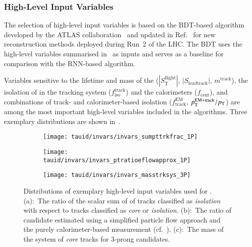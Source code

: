 \subsubsection{High-Level Input Variables}

The selection of high-level input variables is based on the BDT-based
\tauid algorithm developed by the ATLAS
collaboration~\cite{ATL-PHYS-PUB-2015-045} and updated in
Ref.~\cite{cdeutsch-master} for new \tauhadvis reconstruction methods
deployed during Run~2 of the LHC. The BDT \tauid uses the high-level
variables summarised in~ as inputs and
serves as a baseline for comparison with the RNN-based algorithm.

Variables sensitive to the lifetime and mass of the \taulepton
($|S_{\text{T}}^{\text{flight}}|$, $|S_{\text{leadtrack}}|$,
$m^{\text{track}}$), the isolation of \tauhadvis in the tracking
system ($f_{\text{iso}}^{\text{track}}$) and the calorimeters
($f_{\text{cent}}$), and combinations of track- and calorimeter-based
isolation ($f_{\text{track}}^{\text{EM}}$,
$p_{\text{T}}^{\text{EM+track}} / p_{\text{T}}$) are among the most important
high-level variables included in the \tauid algorithms. Three
exemplary distributions are shown in~.


\begin{figure}[htbp]
  \centering

  \begin{subfigure}{0.33\textwidth}
    \texttt{[image: tauid/invars/invars\_sumpttrkfrac\_1P]}
    \subcaption{}
  \end{subfigure}\hfill%
  \begin{subfigure}{0.33\textwidth}
    \texttt{[image: tauid/invars/invars\_ptratioeflowapprox\_1P]}
    \subcaption{}
  \end{subfigure}\hfill%
  \begin{subfigure}{0.33\textwidth}
    \texttt{[image: tauid/invars/invars\_masstrksys\_3P]}
    \subcaption{}
  \end{subfigure}

  \caption{Distributions of exemplary high-level input variables used
    for \tauid. (a):~The ratio of the scalar sum of \pT of tracks
    classified as \emph{isolation} with respect to tracks classified
    as \emph{core} or \emph{isolation}. (b):~The ratio of \tauhadvis
    candidate \pT estimated using a simplified particle flow approach
    and the purely calorimeter-based measurement
    (cf.~). (c):~The mass of the
    system of \emph{core} tracks for 3-prong \tauhadvis candidates.}%
  \label{fig:tauid_high_level_vars}
\end{figure}


